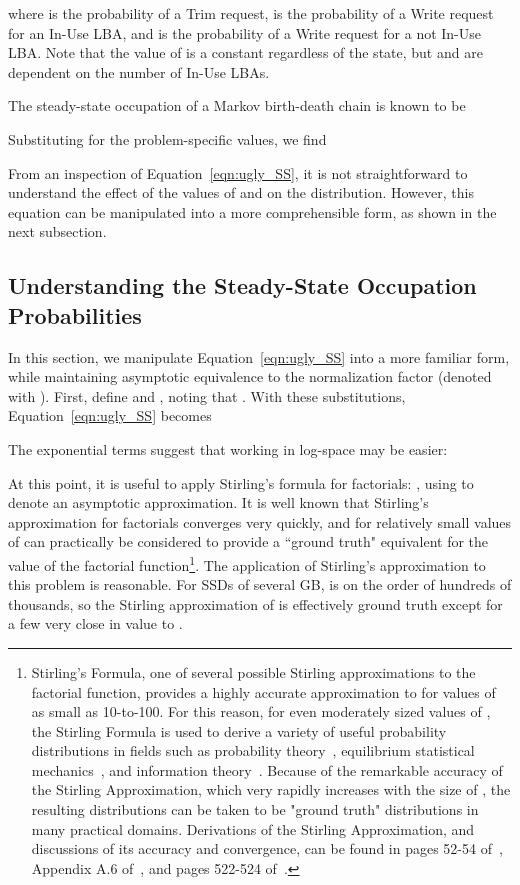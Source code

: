 \documentclass[prodmode,acmtos]{acmsmall}
\begin{document}
where  is the probability of a Trim request,  is the probability of a Write request for an In-Use LBA, and  is the probability of a Write request for a not In-Use LBA.  Note that the value of  is a constant  regardless of the state, but  and  are dependent on the number of In-Use LBAs.

The steady-state occupation of a Markov birth-death chain is known to be~\cite{hoel1971}

Substituting for the problem-specific values, we find

From an inspection of Equation~\ref{eqn:ugly_SS}, it is not straightforward to understand the effect of the values of  and  on the distribution.  However, this equation can be manipulated into a more comprehensible form, as shown in the next subsection.

\subsection{Understanding the Steady-State Occupation Probabilities}
In this section, we manipulate Equation~\ref{eqn:ugly_SS} into a more familiar form, while maintaining asymptotic equivalence to the normalization factor (denoted with ).  First, define  and , noting that .  With these substitutions, Equation~\ref{eqn:ugly_SS} becomes

The exponential terms suggest that working in log-space may be easier:

At this point, it is useful to apply Stirling's formula for factorials: , using  to denote an asymptotic approximation. It is well known that Stirling's approximation for factorials converges very quickly, and for relatively small values of  can practically be considered to provide a ``ground truth" equivalent for the value of the factorial function\footnote{Stirling's Formula, one of several possible Stirling approximations to the factorial function, provides a highly accurate approximation to  for values of  as small as 10-to-100.  For this reason, for even moderately sized values of , the Stirling Formula is used to derive a variety of useful probability distributions in fields such as probability theory~\cite{feller1968}, equilibrium statistical mechanics~\cite{reif1965}, and information theory~\cite{cover2006elements}.  Because of the remarkable accuracy of the Stirling Approximation, which very rapidly increases with the size of , the resulting distributions can be taken to be "ground truth" distributions in many practical domains.  Derivations of the Stirling Approximation, and discussions of its accuracy and convergence, can be found in pages 52-54 of~\cite{feller1968}, Appendix A.6 of~\cite{reif1965}, and pages 522-524 of~\cite{courant1953}.}.  The application of Stirling's approximation to this problem is reasonable.  For SSDs of several GB,  is on the order of hundreds of thousands, so the Stirling approximation of  is effectively ground truth except for a few  very close in value to .
\end{document}
